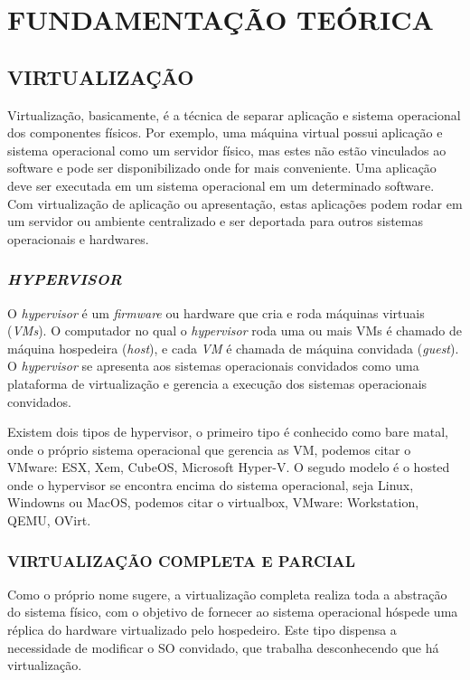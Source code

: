 \chapter{FUNDAMENTAÇÃO TEÓRICA}
\label{chap:fundamentacaoTeorica}

\section{VIRTUALIZAÇÃO}
\label{sec:virtualizacao}

Virtualização, basicamente, é a técnica de separar aplicação e sistema operacional dos componentes físicos. Por exemplo, uma máquina virtual possui aplicação e sistema operacional como um servidor físico, mas estes não estão vinculados ao software e pode ser disponibilizado onde for mais conveniente. Uma aplicação deve ser executada em um sistema operacional em um determinado software. Com virtualização de aplicação ou apresentação, estas aplicações podem rodar em um servidor ou ambiente centralizado e ser deportada para outros sistemas operacionais e hardwares.

\subsection{\textit{HYPERVISOR}}
\label{sec:hypervisor}

O \textit{hypervisor} é um \textit{firmware} ou hardware que cria e roda máquinas virtuais (\textit{VMs}). O computador no qual o \textit{hypervisor} roda uma ou mais VMs é chamado de máquina hospedeira (\textit{host}), e cada \textit{VM} é chamada de máquina convidada (\textit{guest}). O \textit{hypervisor} se apresenta aos sistemas operacionais convidados como uma plataforma de virtualização e gerencia a execução dos sistemas operacionais convidados. 

Existem dois tipos de hypervisor, o primeiro tipo é conhecido como bare matal, onde o próprio sistema operacional que gerencia as VM, podemos citar o VMware: ESX, Xem, CubeOS, Microsoft Hyper-V. O segudo modelo é o hosted onde o hypervisor se encontra encima do sistema operacional, seja Linux, Windowns ou MacOS, podemos citar o virtualbox, VMware: Workstation, QEMU, OVirt.   

\subsection{VIRTUALIZAÇÃO COMPLETA E PARCIAL}
\label{sec:virtualizacao-completa-parcial}

Como o próprio nome sugere, a virtualização completa realiza toda a abstração do sistema físico, com o objetivo de fornecer ao sistema operacional hóspede uma réplica do hardware  virtualizado pelo hospedeiro. Este tipo dispensa a necessidade de modificar o SO convidado, que trabalha desconhecendo que há virtualização.

